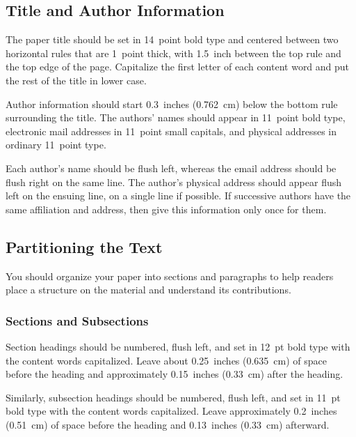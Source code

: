 \documentclass[11pt,letterpaper]{article}
\begin{document}
\subsection{Title and Author Information}

The paper title should be set in 14~point bold type and centered
between two horizontal rules that are 1~point thick, with 1.5~inch
between the top rule and the top edge of the page. Capitalize the
first letter of each content word and put the rest of the title in 
lower case.

Author information should start 0.3~inches (0.762~cm) below the bottom
rule surrounding the title. The authors' names should appear in
11~point bold type, electronic mail addresses in 11~point small
capitals, and physical addresses in ordinary 11~point type.

Each author's name should be flush left, whereas the email address
should be flush right on the same line. The author's physical address
should appear flush left on the ensuing line, on a single line if
possible. If successive authors have the same affiliation and address, 
then give this information only once for them. 

\subsection{Partitioning the Text} 

You should organize your paper into sections and paragraphs to help 
readers place a structure on the material and understand its 
contributions. 

\vspace{-0.018in}
\subsubsection{Sections and Subsections}
\vspace{-0.015in}

Section headings should be numbered, flush left, and set in 12~pt 
bold type with the content words capitalized. Leave about 0.25~inches
(0.635~cm) of space before the heading and approximately 0.15~inches 
(0.33~cm) after the heading.

Similarly, subsection headings should be numbered, flush left, and 
set in 11~pt bold type with the content words capitalized. Leave
approximately 0.2~inches (0.51~cm) of space before the heading and 
0.13~inches (0.33~cm) afterward.
\end{document}

